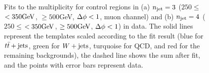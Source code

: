 \begin{figure}[!h]
\begin{center}
    \caption{Fits to the \nbtag multiplicity for control regions in (a) $n_{\rm jet} = 3$ ($250\leq$\LT$<350\rm GeV$, \HT$\geq500$GeV, $\Delta \phi<1$, muon channel) and (b) $n_{\rm jet} = 4$ ($250\leq$\LT$<350\rm GeV$, \HT$\geq500\rm GeV$, $\Delta \phi<1$) in data.
The solid lines represent the templates scaled according to the fit result (blue for $t\bar{t}+\textrm{jets}$, green for $W+\textrm{jets}$, turquoise for QCD, and red for the remaining backgrounds), the dashed line shows the sum after fit, and the points with error bars represent data.}
    \label{fig:btagMultiplicityFit_val_data}
\end{center}
\end{figure}
